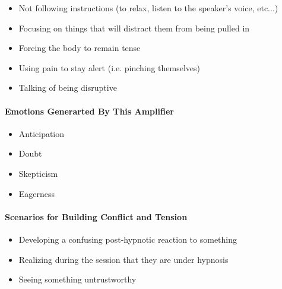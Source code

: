 \begin{itemize}
    \item Not following instructions (to relax, listen to the speaker's voice, etc...)
    \item Focusing on things that will distract them from being pulled in
    \item Forcing the body to remain tense
    \item Using pain to stay alert (i.e. pinching themselves)
    \item Talking of being disruptive 
\end{itemize}

\paragraph{Emotions Generarted By This Amplifier}

\begin{itemize}
    \item Anticipation
    \item Doubt
    \item Skepticism
    \item Eagerness
\end{itemize}

\paragraph{Scenarios for Building Conflict and Tension}



\begin{itemize}
    \item Developing a confusing post-hypnotic reaction to something
    \item Realizing during the session that they are under hypnosis
    \item Seeing something untrustworthy
\end{itemize}